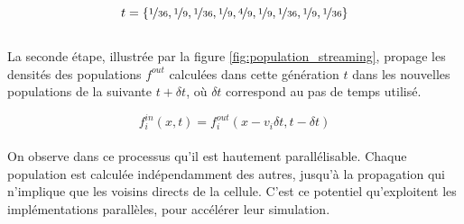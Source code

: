 \begin{equation}
t = \{\nicefrac{1}{36} , \nicefrac{1}{9}, \nicefrac{1}{36}, \nicefrac{1}{9}, \nicefrac{4}{9}, \nicefrac{1}{9}, \nicefrac{1}{36}, \nicefrac{1}{9}, \nicefrac{1}{36}\}
\end{equation}\\[-\baselineskip]

La seconde étape, illustrée par la figure \ref{fig:population_streaming}, propage les densités des populations $f^{out}$ calculées dans cette génération $t$ dans les nouvelles populations de la suivante $t+\delta t$, où $\delta t$ correspond au pas de temps utilisé.

\begin{equation}
f^{in}_i(x,t) = f^{out}_i(x-v_i\delta t, t - \delta t)
\end{equation}\\[-\baselineskip]

On observe dans ce processus qu'il est hautement parallélisable. Chaque population est calculée indépendamment des autres, jusqu'à la propagation qui n'implique que les voisins directs de la cellule. C'est ce potentiel qu'exploitent les implémentations parallèles, pour accélérer leur simulation.

